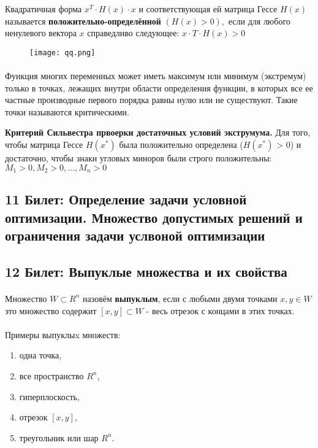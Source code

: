 \documentclass[14pt, letterpaper]{article}
\begin{document}
Квадратичная форма $x^T \cdot H(x) \cdot x$ и соответствующая ей матрица Гессе $H(x)$ называется \textbf{положительно-определённой} $(H(x) > 0),$ если для любого ненулевого вектора $x$ справедливо следующее: $x \cdot T \cdot H(x) > 0$

\begin{figure}[h]
    \centering       
    \texttt{[image: qq.png]}        
    \end{figure}

\paragraph{}
Функция многих переменных может иметь максимум или минимум (экстремум) только в точках, лежащих внутри области определения функции, в которых все ее частные производные первого порядка равны нулю или не существуют. Такие точки называются критическими.

\textbf{Критерий Сильвестра првоерки достаточных условий экструмума.}
Для того, чтобы матрица Гессе $H(x^{*})$ была положительно определена ($H(x^{*})$ > 0) и достаточно, чтобы знаки угловых миноров были строго положительны: $M_{1} > 0, M_{2} > 0, \ldots, M_{n} > 0$ 
        

\newpage
\subsection{11 Билет: Определение задачи условной оптимизации. Множество допустимых решений и ограничения задачи 
услвоной оптимизации}

\newpage
\subsection{12 Билет: Выпуклые множества и их свойства}
\paragraph{}
Множество $W \subset R^{n}$ назовём \textbf{выпуклым}, если с любыми двумя точками $x, y \in W$ это множество содержит $[x, y] \subset W$ - весь отрезок с концами в этих точках.

\paragraph{}
Примеры выпуклыx множеств:
\begin{enumerate}
    \item одна точка, 
    \item все пространство $R^{n}$,
    \item гиперплоскость,
    \item отрезок $[x, y]$,
    \item треугольник или шар $R^{n}$.
\end{enumerate}
\end{document}
